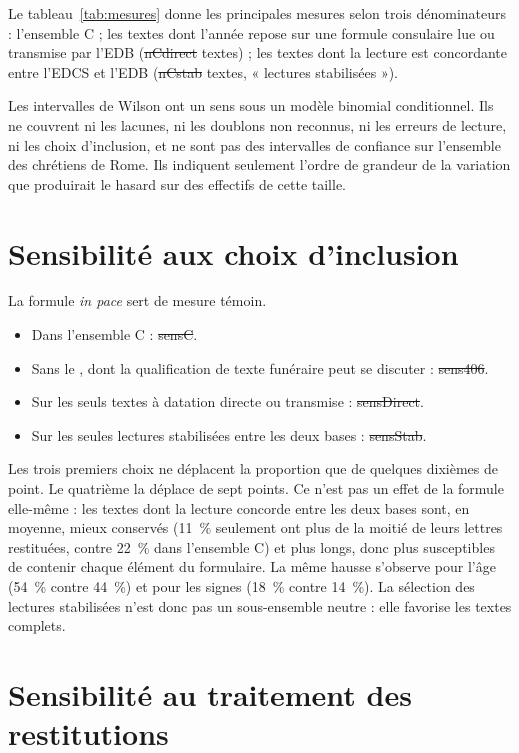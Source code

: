 Le tableau~\ref{tab:mesures} donne les principales mesures selon trois dénominateurs : l’ensemble C ; les textes dont l’année repose sur une formule consulaire lue ou transmise par l’EDB (\st{nCdirect} textes) ; les textes dont la lecture est concordante entre l’EDCS et l’EDB (\st{nCstab} textes, « lectures stabilisées »).



Les intervalles de Wilson ont un sens sous un modèle binomial conditionnel. Ils ne couvrent ni les lacunes, ni les doublons non reconnus, ni les erreurs de lecture, ni les choix d’inclusion, et ne sont pas des intervalles de confiance sur l’ensemble des chrétiens de Rome. Ils indiquent seulement l’ordre de grandeur de la variation que produirait le hasard sur des effectifs de cette taille.

\section{Sensibilité aux choix d’inclusion}

La formule \emph{in pace} sert de mesure témoin.

\begin{itemize}
\item Dans l’ensemble C : \st{sensC}.
\item Sans le , dont la qualification de texte funéraire peut se discuter : \st{sens406}.
\item Sur les seuls textes à datation directe ou transmise : \st{sensDirect}.
\item Sur les seules lectures stabilisées entre les deux bases : \st{sensStab}.
\end{itemize}

Les trois premiers choix ne déplacent la proportion que de quelques dixièmes de point. Le quatrième la déplace de sept points. Ce n’est pas un effet de la formule elle-même : les textes dont la lecture concorde entre les deux bases sont, en moyenne, mieux conservés (11~\% seulement ont plus de la moitié de leurs lettres restituées, contre 22~\% dans l’ensemble C) et plus longs, donc plus susceptibles de contenir chaque élément du formulaire. La même hausse s’observe pour l’âge (54~\% contre 44~\%) et pour les signes (18~\% contre 14~\%). La sélection des lectures stabilisées n’est donc pas un sous-ensemble neutre : elle favorise les textes complets.

\section{Sensibilité au traitement des restitutions}

